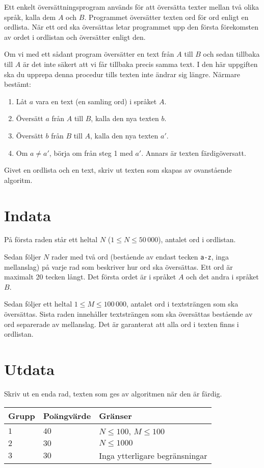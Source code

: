 Ett enkelt översättningsprogram används för att översätta texter mellan två
olika språk, kalla dem $A$ och $B$. Programmet översätter texten ord för ord enligt
en ordlista. När ett ord ska översättas letar programmet upp den första
förekomsten av ordet i ordlistan och översätter enligt den. 

Om vi med ett sådant program översätter en text från $A$ till $B$ och sedan tillbaka till $A$ är det inte säkert att vi får tillbaka precis samma text. I den här uppgiften ska du upprepa denna procedur tills texten inte ändrar sig längre. Närmare bestämt:
\begin{enumerate}
    \item Låt $a$ vara en text (en samling ord) i språket $A$.
    \item Översätt $a$ från $A$ till $B$, kalla den nya texten $b$.
    \item Översätt $b$ från $B$ till $A$, kalla den nya texten $a'$.
    \item Om $a \not = a'$, börja om från steg 1 med $a'$. Annars är texten färdigöversatt.
\end{enumerate}

Givet en ordlista och en text, skriv ut texten som skapas av ovanstående algoritm.

\section*{Indata}
På första raden står ett heltal $N$ ($1 \leq N \leq 50\,000$), antalet ord i ordlistan.

Sedan följer $N$ rader med två ord (bestående av endast tecken \texttt{a-z},
inga mellanslag) på varje rad som beskriver hur ord ska översättas. Ett ord är maximalt 20 tecken långt.
Det första ordet är i språket $A$ och det andra i språket $B$.

Sedan följer ett heltal $1 \leq M \leq 100\,000$,
antalet ord i textsträngen som ska översättas. Sista raden innehåller textsträngen som ska översättas
bestående av ord separerade av mellanslag. Det är garanterat
att alla ord i texten finns i ordlistan.

\section*{Utdata}
Skriv ut en enda rad, texten som ges av algoritmen när den är färdig.

\noindent
\begin{tabular}{| l | l | l |}
  \hline
  Grupp & Poängvärde & Gränser \\ \hline
  $1$   & $40$       & $N \leq 100$, $M \leq 100$ \\ \hline
  $2$   & $30$       & $N \leq 1000$ \\ \hline
  $3$   & $30$       & Inga ytterligare begränsningar \\ \hline
\end{tabular}

